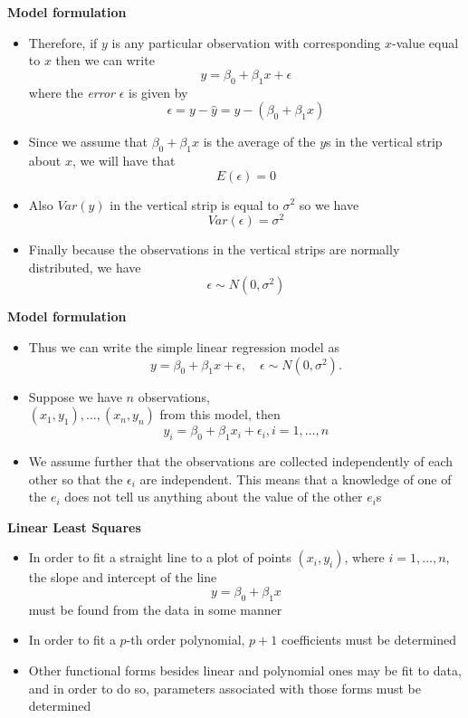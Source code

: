 \documentclass[landscape]{slides}
\newcommand{\heading}[1]{%
  \begin{center}
    \large\bf \color{red}
        #1
  \end{center}
  \vspace{1ex minus 1ex}}
\begin{document}
\begin{slide}
\heading{Model formulation}
\begin{itemize}

\item Therefore, if $y$ is any particular observation with corresponding $x$-value equal to 
$x$ then we can write 
$$y=\beta_0+\beta_1 x+\epsilon$$
where the {\it error } $\epsilon$ is given by
$$\epsilon=y-\hat{y}=y-(\beta_0+\beta_1 x)$$

\item Since we assume that $\beta_0+\beta_1 x$ is the average of the $y$s in the vertical strip about $x$, we will
have that
$$E(\epsilon)=0$$

\item Also $Var(y)$ in the vertical strip is equal to $\sigma^2$ so we have
$$Var(\epsilon)=\sigma^2$$

\item Finally because the observations in the vertical strips are normally distributed, we
have
$$\epsilon \sim N(0,\sigma^2)$$
\end{itemize}
\end{slide}
\begin{slide}
\heading{Model formulation}
\begin{itemize}

\item Thus we can write the simple linear regression model as
$$y=\beta_0+\beta_1 x+\epsilon, \quad \epsilon \sim N(0,\sigma^2).$$

\item Suppose we have $n$ observations, \\
$(x_1,y_1),\ldots,(x_n,y_n)$ from this model, then
$$y_i=\beta_0+\beta_1 x_i+\epsilon_i, i=1,\ldots, n$$
%
\item We assume further that the observations are collected independently of each other so that
the $\epsilon_i$ are independent. This means that a knowledge of one of the $e_i$ does not tell
us anything about the value of the other $e_i$s

\end{itemize}
\end{slide}
\begin{slide}
\heading{Linear Least Squares}
\begin{itemize}
\item In order to fit a straight line to a plot of points
$(x_i,y_i)$, where $i=1,\ldots,n$, the slope and intercept of the
line 
$$y =\beta_0+\beta_1x$$
must be found from the data in some manner

\item In order to fit a $p$-th order polynomial, $p+1$ coefficients must
be determined

\item Other functional forms besides linear and polynomial ones may be fit to 
data, and in order to do so, parameters associated with those forms must be
determined

\end{itemize}
\end{slide}
\end{document}
